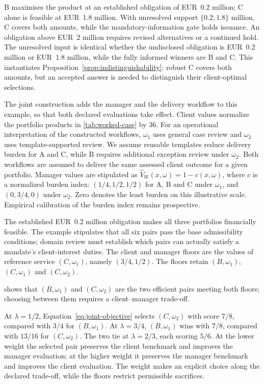 \documentclass[oneside,10pt,english]{swissi}
\begin{document}
B maximises the product at an established obligation of EUR~0.2 million; C alone is feasible at EUR~1.8 million. With unresolved support $\{0.2,1.8\}$ million, C covers both amounts, while the mandatory-information gate holds issuance. An obligation above EUR~2 million requires revised alternatives or a continued hold. The unresolved input is identical whether the undisclosed obligation is EUR~0.2 million or EUR~1.8 million, while the fully informed winners are B and C. This instantiates Proposition~\ref{prop:indistinguishability}: robust C covers both amounts, but an accepted answer is needed to distinguish their client-optimal selections.

The joint construction adds the manager and the delivery workflow to this example, so that both declared evaluations take effect. Client values normalize the portfolio products in \cref{tab:worked-case} by 36. For an operational interpretation of the constructed workflows, $\omega_1$ uses general case review and $\omega_2$ uses template-supported review. We assume reusable templates reduce delivery burden for A and C, while B requires additional exception review under $\omega_2$. Both workflows are assumed to deliver the same assessed client outcome for a given portfolio. Manager values are stipulated as $\widehat V_W(x,\omega)=1-c(x,\omega)$, where $c$ is a normalized burden index: $(1/4,1/2,1/2)$ for A, B and C under $\omega_1$, and $(0,3/4,0)$ under $\omega_2$. Zero denotes the least burden on this illustrative scale. Empirical calibration of the burden index remains prospective.

The established EUR~0.2 million obligation makes all three portfolios financially feasible. The example stipulates that all six pairs pass the base admissibility conditions; domain review must establish which pairs can actually satisfy a mandate's client-interest duties. The client and manager floors are the values of reference service $(C,\omega_1)$, namely $(3/4,1/2)$. The floors retain $(B,\omega_1)$, $(C,\omega_1)$ and $(C,\omega_2)$.

 shows that $(B,\omega_1)$ and $(C,\omega_2)$ are the two efficient pairs meeting both floors; choosing between them requires a client--manager trade-off.



At $\lambda=1/2$, Equation~\eqref{eq:joint-objective} selects $(C,\omega_2)$ with score $7/8$, compared with $3/4$ for $(B,\omega_1)$. At $\lambda=3/4$, $(B,\omega_1)$ wins with $7/8$, compared with $13/16$ for $(C,\omega_2)$. The two tie at $\lambda=2/3$, each scoring $5/6$. At the lower weight the selected pair preserves the client benchmark and improves the manager evaluation; at the higher weight it preserves the manager benchmark and improves the client evaluation. The weight makes an explicit choice along the declared trade-off, while the floors restrict permissible sacrifices.
\end{document}
